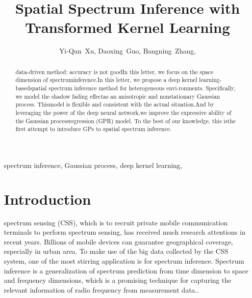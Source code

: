 \documentclass[journal, oneside, twocolumn]{IEEEtran}
\date{}
\title{Spatial Spectrum Inference with Transformed Kernel Learning}
\begin{document}
\author{
  Yi-Qun~Xu,
  Daoxing~Guo,%
  Bangning~Zhang,%

}


\maketitle


\begin{abstract}
data-driven method: accuracy is not goodIn this letter, we focus on the space dimension of spectruminference.In this letter, we propose a deep kernel learning-basedspatial spectrum inference method for heterogeneous envi-ronments. Specifically, we model the shadow fading effectas an anisotropic and nonstationary Gaussian process. Thismodel is flexible and consistent with the actual situation.And by leveraging the power of the deep neural network,we improve the expressive ability of the Gaussian processregression (GPR) model. To the best of our knowledge, this isthe first attempt to introduce GPs to spatial spectrum inference.
\end{abstract}


\begin{IEEEkeywords}
  spectrum inference, Gaussian process, deep kernel learning,
\end{IEEEkeywords}

\section{Introduction}
 spectrum sensing (CSS), which is to recruit private mobile communication terminals to perform spectrum sensing, has received much research attentions \cite{Ding2014, Jin2018, Han2019, Hu2020, Amin2020} in recent years. Billions of mobile devices can guarantee geographical coverage, especially in urban area. To make use of the big data collected by the CSS system, one of the most stirring application is for spectrum inference. Spectrum inference is a generalization of spectrum prediction from time dimension to space and frequency dimensions, which is a promising technique for capturing the relevant information of radio frequency from measurement data.\cite{Ding2018}.
\end{document}
